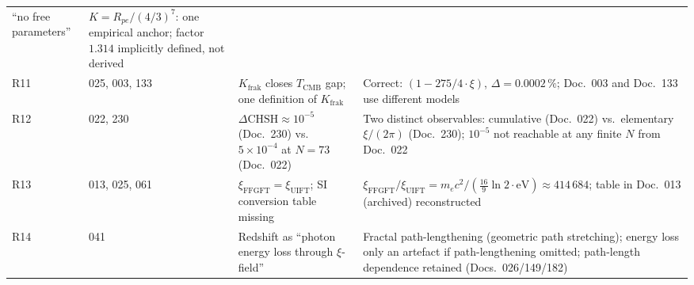 \begin{center}
{{\begin{tabular}{p{0.5cm}p{2.4cm}p{4.4cm}p{4.4cm}}
  \enquote{no free parameters} &
  $K = R_{pe}/(4/3)^7$: one empirical anchor; \newline
  factor $1.314$ implicitly defined, not derived \\[3pt]
R11 & 025, 003, 133 &
  $K_\text{frak}$ closes $T_\text{CMB}$ gap; \newline
  one definition of $K_\text{frak}$ &
  Correct: $(1-275/4\cdot\xi)$, $\Delta=0.0002\,\%$; \newline
  Doc.~003 and Doc.~133 use different models \\[3pt]
R12 & 022, 230 &
  $\Delta\text{CHSH} \approx 10^{-5}$ (Doc.~230) vs.\ \newline
  $5\times10^{-4}$ at $N=73$ (Doc.~022) &
  Two distinct observables: cumulative (Doc.~022) vs.\ elementary $\xi/(2\pi)$ (Doc.~230); \newline
  $10^{-5}$ not reachable at any finite $N$ from Doc.~022 \\[3pt]
R13 & 013, 025, 061 &
  $\xi_\text{FFGFT} = \xi_\text{UIFT}$; \newline
  SI conversion table missing &
  $\xi_\text{FFGFT}/\xi_\text{UIFT} = m_ec^2/(\frac{16}{9}\ln 2\cdot\text{eV}) \approx 414\,684$; \newline
  table in Doc.~013 (archived) reconstructed \\[3pt]
R14 & 041 &
  Redshift as \enquote{photon energy loss through $\xi$-field} &
  Fractal path-lengthening (geometric path stretching); energy loss only an artefact if path-lengthening omitted; path-length dependence retained (Docs.~026/149/182) \\
\bottomrule
\end{tabular}
}
}
\end{center}
